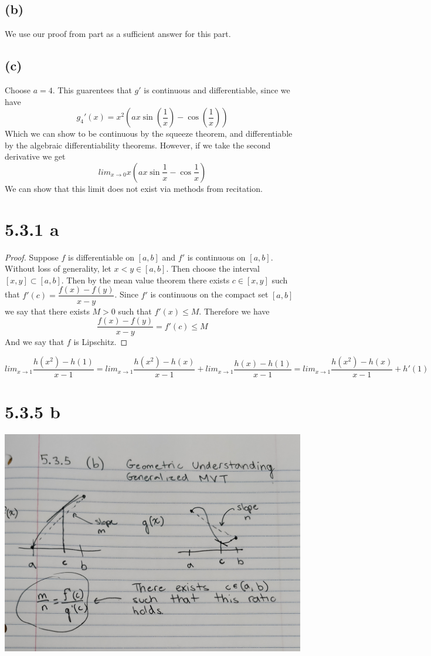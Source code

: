 \documentclass{article}
\begin{document}
\subsection*{(b)}
We use our proof from part  as a sufficient answer for this part.
\subsection*{(c)}
Choose $a = 4$. This guarentees that $g'$ is continuous and differentiable, since we have 
\[ g_4'(x) = x^2 \left(ax \sin\left(\frac{1}{x}\right) - \cos\left(\frac{1}{x}\right)\right)\]
Which we can show to be continuous by the squeeze theorem, and differentiable by the algebraic differentiability theorems. However, if we take the second derivative we get
\[ lim_{x \rightarrow 0}x(ax\sin{\frac{1}{x}}-\cos{\frac{1}{x}}) \]
We can show that this limit does not exist via methods from recitation.
\section*{5.3.1 a}
\begin{proof}
Suppose $f$ is differentiable on $[a,b]$ and $f'$ is continuous on $[a,b]$. Without loss of generality, let $x < y \in [a,b]$. Then choose the interval $[x,y] \subset [a,b]$. Then by the mean value theorem there exists $c \in [x,y]$ such that $f'(c) = \dfrac{f(x)-f(y)}{x-y}$. Since $f'$ is continuous on the compact set $[a,b]$ we say that there exists $M>0$ such that $f'(x) \leqslant M$. Therefore we have
\[ \frac{f(x) - f(y)}{x-y} = f'(c) \leqslant M \]
And we say that $f$ is Lipschitz.
\end{proof}

\[ lim_{x \rightarrow 1} \frac{h(x^2) - h (1)}{x-1} = lim_{x \rightarrow 1} \frac{h(x^2) - h (x)}{x-1}  + lim_{x \rightarrow 1} \frac{h(x) - h(1)}{x-1} = lim_{x \rightarrow 1} \frac{h(x^2) - h (x)}{x-1} + h'(1) \]

\section*{5.3.5 b}
\includegraphics[scale=0.1]{pic.jpg}
\end{document}
